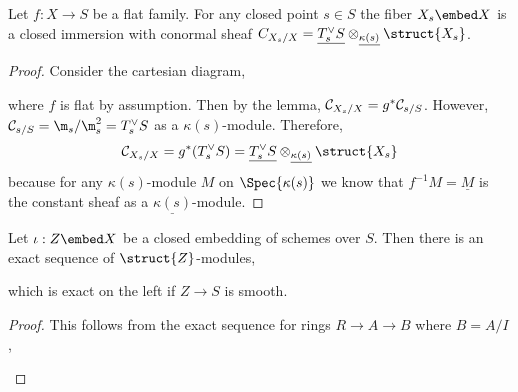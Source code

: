 \documentclass[12pt]{article}
\begin{document}
\begin{cor}
Let $f : X \to S$ be a flat family. For any closed point $s \in S$ the fiber $X_s \embed X$ is a closed immersion with conormal sheaf $C_{X_s/X} = \underline{T_s^\vee S} \otimes_{\underline{\kappa(s)}} \struct{X_s}$.
\end{cor}

\begin{proof}
Consider the cartesian diagram,
\begin{center}
\end{center}
where $f$ is flat by assumption. Then by the lemma, $\mathcal{C}_{X_s/X} = g^* \mathcal{C}_{s/S}$. However, $\C_{s/S} = \m_s / \m_s^2 = T_s^\vee S$ as a $\kappa(s)$-module. Therefore, 
\[ \C_{X_s / X} = g^* (T_s^\vee S) = \underline{T_s^\vee S} \otimes_{\underline{\kappa(s)}} \struct{X_s} \]
because for any $\kappa(s)$-module $M$ on $\Spec{\kappa(s)}$ we know that $f^{-1} M = \underline{M}$ is the constant sheaf as a $\underline{\kappa(s)}$-module. 
\end{proof}

\begin{lemma}
Let $\iota : Z \embed X$ be a closed embedding of schemes over $S$. Then there is an exact sequence of $\struct{Z}$-modules,
\begin{center}
\end{center}
which is exact on the left if $Z \to S$ is smooth.
\end{lemma}

\begin{proof}
This follows from the exact sequence for rings $R \to A \to B$ where $B = A / I$,
\begin{center}
\end{center}
\end{proof}

\newcommand{\X}{\mathcal{X}}
\end{document}
